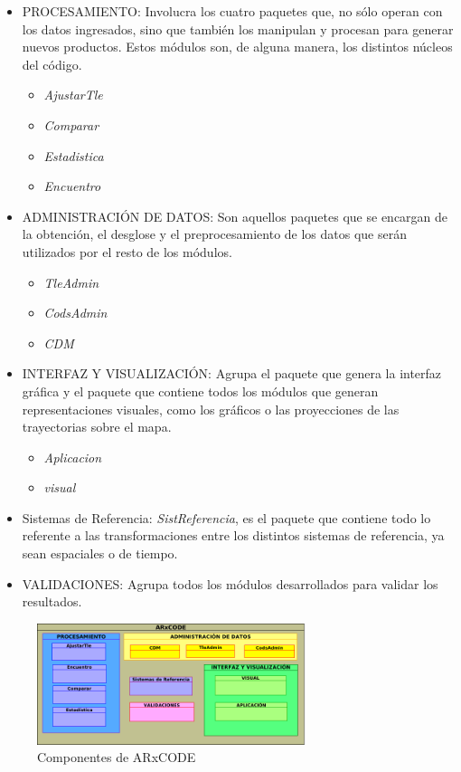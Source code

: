 \begin{itemize}
 \item PROCESAMIENTO: Involucra los cuatro paquetes que, no s\'olo operan con los datos ingresados, sino que tambi\'en los manipulan y procesan para generar nuevos productos. Estos m\'odulos son, de alguna manera, los distintos n\'ucleos del c\'odigo.\\

 \begin{itemize}
 \itemsep0em
  \item {\it{AjustarTle}}
  \item {\it{Comparar}}
  \item {\it{Estadistica}}
  \item {\it{Encuentro}}
 \end{itemize}

 \item ADMINISTRACI\'ON DE DATOS: Son aquellos paquetes que se encargan de la obtenci\'on, el desglose y el preprocesamiento de los datos que ser\'an utilizados por el resto de los m\'odulos.

 \begin{itemize}
 \itemsep0em
  \item {\it{TleAdmin}}
  \item {\it{CodsAdmin}}
  \item {\it{CDM}}
 \end{itemize}

 \item INTERFAZ Y VISUALIZACI\'ON: Agrupa el paquete que genera la interfaz gr\'afica y el paquete que contiene todos los m\'odulos que generan representaciones visuales, como los gr\'aficos o las proyecciones de las trayectorias sobre el mapa.\\
 \begin{itemize}
 \itemsep0em
 \item {\it{Aplicacion}}
 \item {\it{visual}}
 \end{itemize}
 \item Sistemas de Referencia: {\it{SistReferencia}}, es el paquete que contiene todo lo referente a las transformaciones entre los distintos sistemas de referencia, ya sean espaciales o de tiempo.
 \item VALIDACIONES: Agrupa todos los m\'odulos desarrollados para validar los resultados.
\end{itemize}


\begin{figure}[h!]
  \centering
  \includegraphics[width=0.7\textwidth]{imagenes/componentesAR}  
  \caption{Componentes de ARxCODE}
  \label{fig:componentes}
\end{figure}

